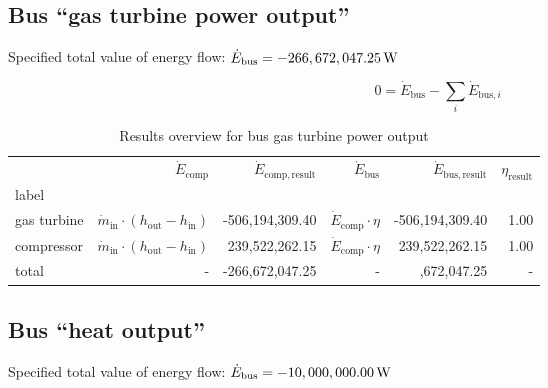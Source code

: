 \documentclass[]{article}
\newcommand{\bftab}{\fontseries{b}\selectfont}
\begin{document}
\subsection{Bus ``gas turbine power output''}

Specified total value of energy flow: $\dot{E}_\mathrm{bus} = \unit[-266,672,047.25]{W}$

\begin{equation}
\label{eq:Bus_energy_flow_sum}
0=\dot{E}_\mathrm{bus} -\sum_i \dot{E}_{\mathrm{bus,}i}
\end{equation}

\begin{table}[H]
\centering
\caption{Results overview for bus gas turbine power output}
\begin{tabular}{lrrrrr}
\toprule
{} &                                                   $\dot{E}_\mathrm{comp}$ & $\dot{E}_\mathrm{comp,result}$ &              $\dot{E}_\mathrm{bus}$ & $\dot{E}_\mathrm{bus,result}$ & $\eta_\mathrm{result}$ \\
label       &                                                                           &                                &                                     &                               &                        \\
\midrule
gas turbine &  $\dot{m}_\mathrm{in} \cdot \left(h_\mathrm{out} - h_\mathrm{in} \right)$ &                -506,194,309.40 &  $\dot{E}_\mathrm{comp} \cdot \eta$ &               -506,194,309.40 &                   1.00 \\
compressor  &  $\dot{m}_\mathrm{in} \cdot \left(h_\mathrm{out} - h_\mathrm{in} \right)$ &                 239,522,262.15 &  $\dot{E}_\mathrm{comp} \cdot \eta$ &                239,522,262.15 &                   1.00 \\
total       &                                                                         - &                -266,672,047.25 &                                   - &         \bftab-266,672,047.25 &                      - \\
\bottomrule
\end{tabular}
\end{table}



\subsection{Bus ``heat output''}

Specified total value of energy flow: $\dot{E}_\mathrm{bus} = \unit[-10,000,000.00]{W}$
\end{document}
